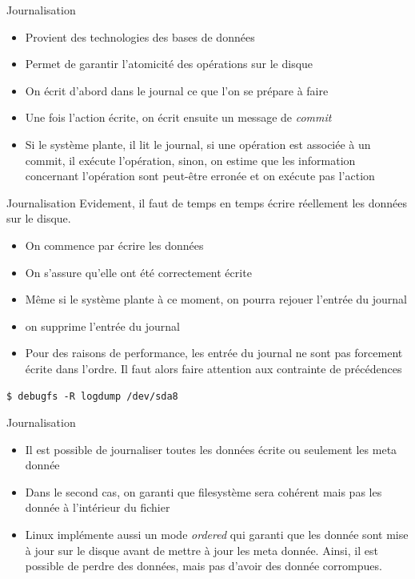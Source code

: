 \begin{frame}[fragile=singleslide]{Journalisation}
  \begin{itemize}
  \item Provient des technologies des bases de données
  \item Permet de garantir l'atomicité des opérations sur le disque
  \item On  écrit d'abord  dans le  journal ce que  l'on se  prépare à
    faire
  \item  Une fois  l'action écrite,  on  écrit ensuite  un message  de
    \emph{commit}
  \item Si le système plante, il  lit le journal, si une opération est
    associée à un commit, il exécute l'opération, sinon, on estime que
    les information  concernant l'opération sont  peut-être erronée et
    on exécute pas l'action
  \end{itemize}
\end{frame}

\begin{frame}[fragile=singleslide]{Journalisation}
  Evidement, il faut  de temps en temps écrire  réellement les données
  sur le disque.
  \begin{itemize}
  \item On commence par écrire les données
  \item On s'assure qu'elle ont été correctement écrite
  \item  Même si  le système  plante à  ce moment,  on  pourra rejouer
    l'entrée du journal
  \item on supprime l'entrée du journal
  \item Pour des raisons de performance, les entrée du journal ne sont
    pas forcement  écrite dans l'ordre. Il faut  alors faire attention
    aux contrainte de précédences
  \end{itemize}
  \begin{lstlisting}
$ debugfs -R logdump /dev/sda8
  \end{lstlisting}
\end{frame}

\begin{frame}[fragile=singleslide]{Journalisation}
  \begin{itemize}
  \item Il  est possible de  journaliser toutes les données  écrite ou
    seulement les meta donnée
  \item Dans le  second cas, on garanti que  filesystème sera cohérent
    mais pas les donnée à l'intérieur du fichier
  \item Linux implémente aussi  un mode \emph{ordered} qui garanti que
    les donnée sont  mise à jour sur le disque avant  de mettre à jour
    les meta  donnée. Ainsi,  il est possible  de perdre  des données,
    mais pas d'avoir des donnée corrompues.
  \end{itemize}
\end{frame}

